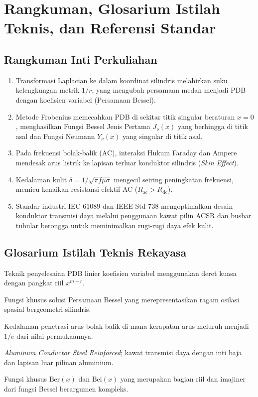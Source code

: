 \documentclass[11pt,a4paper]{article}
\theoremstyle{definition}
\begin{document}
\section{Rangkuman, Glosarium Istilah Teknis, dan Referensi Standar}

\subsection{Rangkuman Inti Perkuliahan}
\begin{enumerate}[leftmargin=*]
    \item Transformasi Laplacian ke dalam koordinat silindris melahirkan suku kelengkungan metrik $1/r$, yang mengubah persamaan medan menjadi PDB dengan koefisien variabel (Persamaan Bessel).
    \item Metode Frobenius memecahkan PDB di sekitar titik singular beraturan $x = 0$, menghasilkan Fungsi Bessel Jenis Pertama $J_\nu(x)$ yang berhingga di titik asal dan Fungsi Neumann $Y_\nu(x)$ yang singular di titik asal.
    \item Pada frekuensi bolak-balik (AC), interaksi Hukum Faraday dan Ampere mendesak arus listrik ke lapisan terluar konduktor silindris (\textit{Skin Effect}).
    \item Kedalaman kulit $\delta = 1/\sqrt{\pi f \mu \sigma}$ mengecil seiring peningkatan frekuensi, memicu kenaikan resistansi efektif AC ($R_{\text{ac}} > R_{\text{dc}}$).
    \item Standar industri IEC 61089 dan IEEE Std 738 mengoptimalkan desain konduktor transmisi daya melalui penggunaan kawat pilin ACSR dan busbar tubular berongga untuk meminimalkan rugi-rugi daya efek kulit.
\end{enumerate}

\subsection{Glosarium Istilah Teknis Rekayasa}
\begin{description}[leftmargin=!,labelwidth=3.5cm]
    \item[Frobenius Method] Teknik penyelesaian PDB linier koefisien variabel menggunakan deret kuasa dengan pangkat riil $x^{m+r}$.
    \item[Bessel Function] Fungsi khusus solusi Persamaan Bessel yang merepresentasikan ragam osilasi spasial bergeometri silindris.
    \item[Skin Depth ($\delta$)] Kedalaman penetrasi arus bolak-balik di mana kerapatan arus meluruh menjadi $1/e$ dari nilai permukaannya.
    \item[ACSR] \textit{Aluminum Conductor Steel Reinforced}; kawat transmisi daya dengan inti baja dan lapisan luar pilinan aluminium.
    \item[Kelvin Functions] Fungsi khusus $\text{Ber}(x)$ dan $\text{Bei}(x)$ yang merupakan bagian riil dan imajiner dari fungsi Bessel berargumen kompleks.
\end{description}
\end{document}
